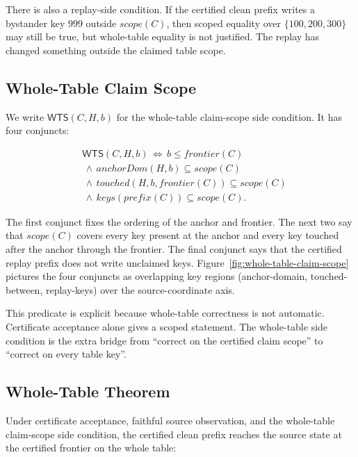 \documentclass[letterpaper,10pt,twocolumn]{article}
\newcommand{\Scope}{\mathit{scope}}
\newcommand{\Frontier}{\mathit{frontier}}
\newcommand{\CleanPrefix}{\mathit{prefix}}
\newcommand{\AnchorDomain}{\mathit{anchorDom}}
\newcommand{\TouchedBetween}{\mathit{touched}}
\newcommand{\ReplayKeys}{\mathit{keys}}
\newcommand{\WTS}{\mathsf{WTS}}
\begin{document}
There is also a replay-side condition. If the certified clean prefix
writes a bystander key $999$ outside $\Scope(C)$, then
scoped equality over $\{100,200,300\}$ may still be true, but
whole-table equality is not justified. The replay has changed something
outside the claimed table scope.

\subsection{Whole-Table Claim Scope}\label{whole-table-claim-scope}

We write $\WTS(C,H,b)$ for the whole-table claim-scope side condition.
It has four conjuncts:

\[
\begin{aligned}
&\WTS(C,H,b) \,\Longleftrightarrow\, b \le \Frontier(C)\\
&\,\land\, \AnchorDomain(H,b) \subseteq \Scope(C)\\
&\,\land\, \TouchedBetween(H,b,\Frontier(C)) \subseteq \Scope(C)\\
&\,\land\, \ReplayKeys(\CleanPrefix(C)) \subseteq \Scope(C).
\end{aligned}
\]

The first conjunct fixes the ordering of the anchor and frontier. The
next two say that $\Scope(C)$ covers every key present at the
anchor and every key touched after the anchor through the frontier. The
final conjunct says that the certified replay prefix does not write
unclaimed keys.
Figure~\ref{fig:whole-table-claim-scope} pictures the four conjuncts as
overlapping key regions (anchor-domain, touched-between, replay-keys)
over the source-coordinate axis.

\begin{figure}[t]
  
\end{figure}

This predicate is explicit because whole-table correctness is not
automatic. Certificate acceptance alone gives a scoped statement. The
whole-table side condition is the extra bridge from ``correct on the
certified claim scope'' to ``correct on every table key''.

\subsection{Whole-Table Theorem}\label{whole-table-theorem}

Under certificate acceptance, faithful source observation, and the
whole-table claim-scope side condition, the certified clean prefix
reaches the source state at the certified frontier on the whole table:
\end{document}
